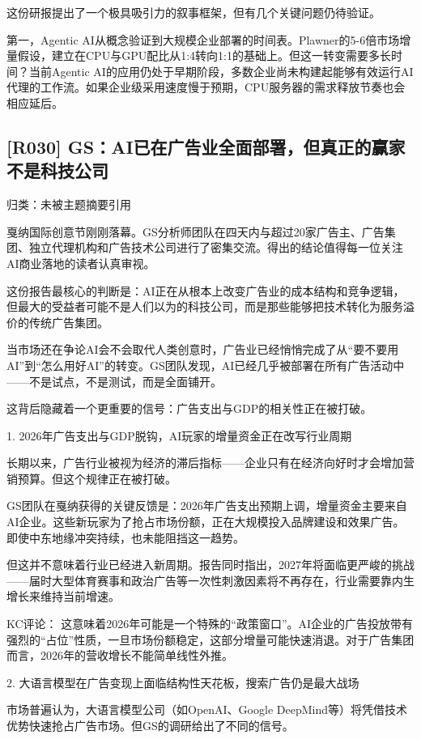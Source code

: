 \documentclass[11pt]{ctexart}
\begin{document}
这份研报提出了一个极具吸引力的叙事框架，但有几个关键问题仍待验证。

第一，Agentic AI从概念验证到大规模企业部署的时间表。Plawner的5-6倍市场增量假设，建立在CPU与GPU配比从1:4转向1:1的基础上。但这一转变需要多长时间？当前Agentic AI的应用仍处于早期阶段，多数企业尚未构建起能够有效运行AI代理的工作流。如果企业级采用速度慢于预期，CPU服务器的需求释放节奏也会相应延后。

\subsection{[R030] GS：AI已在广告业全面部署，但真正的赢家不是科技公司}
{\small\color{refgray}归类：未被主题摘要引用}

戛纳国际创意节刚刚落幕。GS分析师团队在四天内与超过20家广告主、广告集团、独立代理机构和广告技术公司进行了密集交流。得出的结论值得每一位关注AI商业落地的读者认真审视。

这份报告最核心的判断是：AI正在从根本上改变广告业的成本结构和竞争逻辑，但最大的受益者可能不是人们以为的科技公司，而是那些能够把技术转化为服务溢价的传统广告集团。

当市场还在争论AI会不会取代人类创意时，广告业已经悄悄完成了从“要不要用AI”到“怎么用好AI”的转变。GS团队发现，AI已经几乎被部署在所有广告活动中——不是试点，不是测试，而是全面铺开。

这背后隐藏着一个更重要的信号：广告支出与GDP的相关性正在被打破。

1. 2026年广告支出与GDP脱钩，AI玩家的增量资金正在改写行业周期

长期以来，广告行业被视为经济的滞后指标——企业只有在经济向好时才会增加营销预算。但这个规律正在被打破。

GS团队在戛纳获得的关键反馈是：2026年广告支出预期上调，增量资金主要来自AI企业。这些新玩家为了抢占市场份额，正在大规模投入品牌建设和效果广告。即使中东地缘冲突持续，也未能阻挡这一趋势。

但这并不意味着行业已经进入新周期。报告同时指出，2027年将面临更严峻的挑战——届时大型体育赛事和政治广告等一次性刺激因素将不再存在，行业需要靠内生增长来维持当前增速。

KC评论： 这意味着2026年可能是一个特殊的“政策窗口”。AI企业的广告投放带有强烈的“占位”性质，一旦市场份额稳定，这部分增量可能快速消退。对于广告集团而言，2026年的营收增长不能简单线性外推。

2. 大语言模型在广告变现上面临结构性天花板，搜索广告仍是最大战场

市场普遍认为，大语言模型公司（如OpenAI、Google DeepMind等）将凭借技术优势快速抢占广告市场。但GS的调研给出了不同的信号。
\end{document}
